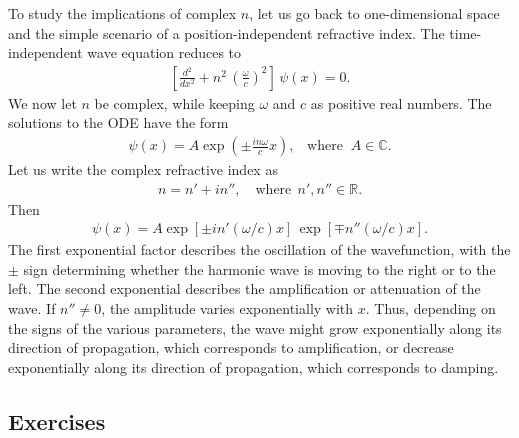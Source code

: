 \documentclass[10pt,a4paper]{article}
\begin{document}
To study the implications of complex $n$, let us go back to
one-dimensional space and the simple scenario of a
position-independent refractive index. The time-independent wave
equation reduces to
\begin{align}
  \left[\frac{d^2}{d x^2} + n^2\, \left(\frac{\omega}{c}\right)^2\right] \, \psi(x) = 0.
\end{align}
We now let $n$ be complex, while keeping $\omega$ and $c$ as positive
real numbers. The solutions to the ODE have the form
\begin{align}
  \psi(x) = A \exp\left(\pm \frac{in\omega}{c}x\right),\;\;\;\mathrm{where}\;\; A \in \mathbb{C}.
  \label{eq:gainloss-wave}
\end{align}
Let us write the complex refractive index as
\begin{align}
  n = n' + i n'',\quad \textrm{where}\;\, n',n'' \in \mathbb{R}.
\end{align}
Then
\begin{align}
  \psi(x) = A \exp\left[\pm in'(\omega/c)x\right]\, \exp\left[\mp n''(\omega/c)x\right].
\end{align}
The first exponential factor describes the oscillation of the
wavefunction, with the $\pm$ sign determining whether the harmonic
wave is moving to the right or to the left. The second exponential
describes the amplification or attenuation of the wave.  If $n'' \ne
0$, the amplitude varies exponentially with $x$. Thus, depending on
the signs of the various parameters, the wave might grow exponentially
along its direction of propagation, which corresponds to
amplification, or decrease exponentially along its direction of
propagation, which corresponds to damping.

\subsection{Exercises}
\label{exercises}
\end{document}
